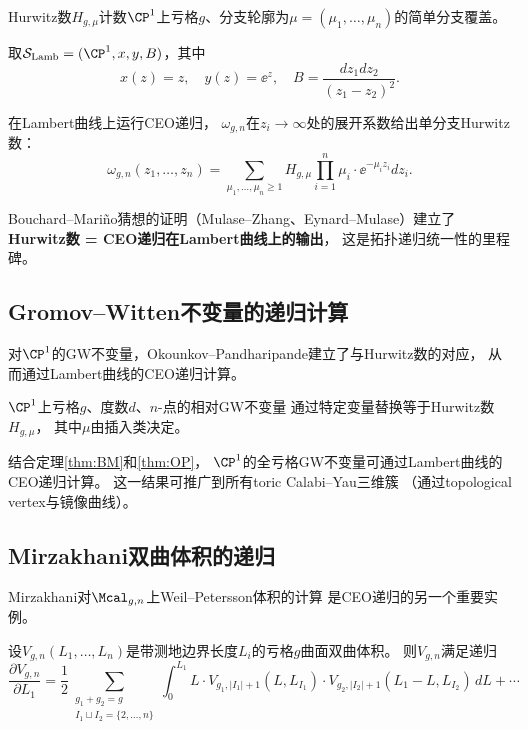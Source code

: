 Hurwitz数$H_{g,\mu}$计数$\CP^1$上亏格$g$、分支轮廓为$\mu = (\mu_1, \ldots, \mu_n)$的简单分支覆盖。

\begin{definition}[Lambert谱曲线]\label{def:lambert}
取$\mathcal{S}_{\mathrm{Lamb}} = (\CP^1, x, y, B)$，其中
\[
x(z) = z, \quad y(z) = \ee^z, \quad B = \frac{dz_1 dz_2}{(z_1 - z_2)^2}.
\]
\end{definition}

\begin{theorem}\label{thm:BM}
在Lambert曲线上运行CEO递归，
$\omega_{g,n}$在$z_i \to \infty$处的展开系数给出单分支Hurwitz数：
\[
\omega_{g,n}(z_1, \ldots, z_n)
= \sum_{\mu_1, \ldots, \mu_n \geq 1}
H_{g,\mu} \prod_{i=1}^n \mu_i \cdot \ee^{-\mu_i z_i} dz_i.
\]
\end{theorem}

Bouchard--Mariño猜想的证明（Mulase--Zhang、Eynard--Mulase）建立了
\textbf{Hurwitz数 = CEO递归在Lambert曲线上的输出}，
这是拓扑递归统一性的里程碑。

\subsection{Gromov--Witten不变量的递归计算}

对$\CP^1$的GW不变量，Okounkov--Pandharipande建立了与Hurwitz数的对应，
从而通过Lambert曲线的CEO递归计算。

\begin{theorem}\label{thm:OP}
$\CP^1$上亏格$g$、度数$d$、$n$-点的相对GW不变量
通过特定变量替换等于Hurwitz数$H_{g,\mu}$，
其中$\mu$由插入类决定。
\end{theorem}

结合定理\ref{thm:BM}和\ref{thm:OP}，
$\CP^1$的全亏格GW不变量可通过Lambert曲线的CEO递归计算。
这一结果可推广到所有toric Calabi--Yau三维簇
（通过topological vertex与镜像曲线）。

\subsection{Mirzakhani双曲体积的递归}

Mirzakhani对$\Mcal_{g,n}$上Weil--Petersson体积的计算
是CEO递归的另一个重要实例。

\begin{theorem}[Mirzakhani递归]\label{thm:mirza}
设$V_{g,n}(L_1, \ldots, L_n)$是带测地边界长度$L_i$的亏格$g$曲面双曲体积。
则$V_{g,n}$满足递归
\begin{equation}\label{eq:mirza}
\frac{\partial V_{g,n}}{\partial L_1}
= \frac{1}{2} \sum_{\substack{g_1+g_2=g \\ I_1 \sqcup I_2 = \{2,\ldots,n\}}}
\int_0^{L_1} L \cdot V_{g_1, |I_1|+1}(L, L_{I_1}) \cdot V_{g_2, |I_2|+1}(L_1 - L, L_{I_2}) \, dL
+ \cdots
\end{equation}
\end{theorem}

